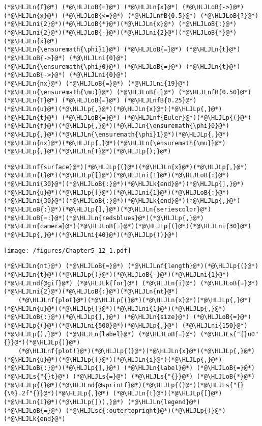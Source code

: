 \documentclass[12pt,a4paper]{article}
\newcommand{\HLJLk}[1]{\textcolor[RGB]{148,91,176}{\textbf{#1}}}
\newcommand{\HLJLn}[1]{#1}
\newcommand{\HLJLnd}[1]{\textcolor[RGB]{214,102,97}{#1}}
\newcommand{\HLJLnf}[1]{\textcolor[RGB]{66,102,213}{#1}}
\newcommand{\HLJLs}[1]{\textcolor[RGB]{201,61,57}{#1}}
\newcommand{\HLJLsc}[1]{\textcolor[RGB]{201,61,57}{#1}}
\newcommand{\HLJLnfB}[1]{\textcolor[RGB]{59,151,46}{#1}}
\newcommand{\HLJLni}[1]{\textcolor[RGB]{59,151,46}{#1}}
\newcommand{\HLJLoB}[1]{\textcolor[RGB]{102,102,102}{\textbf{#1}}}
\newcommand{\HLJLp}[1]{#1}
\begin{document}
\begin{lstlisting}
(*@\HLJLn{f}@*) (*@\HLJLoB{=}@*) (*@\HLJLn{x}@*) (*@\HLJLoB{->}@*) (*@\HLJLn{x}@*) (*@\HLJLoB{<=}@*) (*@\HLJLnfB{0.5}@*) (*@\HLJLoB{?}@*) (*@\HLJLni{2}@*)(*@\HLJLoB{*}@*)(*@\HLJLn{x}@*) (*@\HLJLoB{:}@*) (*@\HLJLni{2}@*)(*@\HLJLoB{-}@*)(*@\HLJLni{2}@*)(*@\HLJLoB{*}@*)(*@\HLJLn{x}@*)
(*@\HLJLn{\ensuremath{\phi}1}@*) (*@\HLJLoB{=}@*) (*@\HLJLn{t}@*) (*@\HLJLoB{->}@*) (*@\HLJLni{0}@*)
(*@\HLJLn{\ensuremath{\phi}0}@*) (*@\HLJLoB{=}@*) (*@\HLJLn{t}@*) (*@\HLJLoB{->}@*) (*@\HLJLni{0}@*)
(*@\HLJLn{nx}@*) (*@\HLJLoB{=}@*) (*@\HLJLni{19}@*)
(*@\HLJLn{\ensuremath{\mu}}@*) (*@\HLJLoB{=}@*) (*@\HLJLnfB{0.50}@*)
(*@\HLJLn{T}@*) (*@\HLJLoB{=}@*) (*@\HLJLnfB{0.25}@*)
(*@\HLJLn{u}@*)(*@\HLJLp{,}@*)(*@\HLJLn{x}@*)(*@\HLJLp{,}@*)(*@\HLJLn{t}@*) (*@\HLJLoB{=}@*) (*@\HLJLnf{Euler}@*)(*@\HLJLp{(}@*)(*@\HLJLn{f}@*)(*@\HLJLp{,}@*)(*@\HLJLn{\ensuremath{\phi}0}@*)(*@\HLJLp{,}@*)(*@\HLJLn{\ensuremath{\phi}1}@*)(*@\HLJLp{,}@*)(*@\HLJLn{nx}@*)(*@\HLJLp{,}@*)(*@\HLJLn{\ensuremath{\mu}}@*)(*@\HLJLp{,}@*)(*@\HLJLn{T}@*)(*@\HLJLp{);}@*)
\end{lstlisting}


\begin{lstlisting}
(*@\HLJLnf{surface}@*)(*@\HLJLp{(}@*)(*@\HLJLn{x}@*)(*@\HLJLp{,}@*)(*@\HLJLn{t}@*)(*@\HLJLp{[}@*)(*@\HLJLni{1}@*)(*@\HLJLoB{:}@*)(*@\HLJLni{30}@*)(*@\HLJLoB{:}@*)(*@\HLJLk{end}@*)(*@\HLJLp{],}@*)(*@\HLJLn{u}@*)(*@\HLJLp{[}@*)(*@\HLJLni{1}@*)(*@\HLJLoB{:}@*)(*@\HLJLni{30}@*)(*@\HLJLoB{:}@*)(*@\HLJLk{end}@*)(*@\HLJLp{,}@*)(*@\HLJLoB{:}@*)(*@\HLJLp{],}@*)(*@\HLJLn{seriescolor}@*)(*@\HLJLoB{=:}@*)(*@\HLJLn{redsblues}@*)(*@\HLJLp{,}@*) (*@\HLJLn{camera}@*)(*@\HLJLoB{=}@*)(*@\HLJLp{(}@*)(*@\HLJLni{30}@*)(*@\HLJLp{,}@*)(*@\HLJLni{40}@*)(*@\HLJLp{))}@*)
\end{lstlisting}

\texttt{[image: /figures/Chapter5\_12\_1.pdf]}

\begin{lstlisting}
(*@\HLJLn{nt}@*) (*@\HLJLoB{=}@*) (*@\HLJLnf{length}@*)(*@\HLJLp{(}@*)(*@\HLJLn{t}@*)(*@\HLJLp{)}@*)(*@\HLJLoB{-}@*)(*@\HLJLni{1}@*)
(*@\HLJLnd{@gif}@*) (*@\HLJLk{for}@*) (*@\HLJLn{i}@*) (*@\HLJLoB{=}@*) (*@\HLJLni{2}@*)(*@\HLJLoB{:}@*)(*@\HLJLn{nt}@*) 
    (*@\HLJLnf{plot}@*)(*@\HLJLp{(}@*)(*@\HLJLn{x}@*)(*@\HLJLp{,}@*) (*@\HLJLn{u}@*)(*@\HLJLp{[}@*)(*@\HLJLni{1}@*)(*@\HLJLp{,}@*)(*@\HLJLoB{:}@*)(*@\HLJLp{],}@*) (*@\HLJLn{size}@*) (*@\HLJLoB{=}@*) (*@\HLJLp{(}@*)(*@\HLJLni{500}@*)(*@\HLJLp{,}@*) (*@\HLJLni{150}@*)(*@\HLJLp{),}@*) (*@\HLJLn{label}@*) (*@\HLJLoB{=}@*) (*@\HLJLs{"{}u0"{}}@*)(*@\HLJLp{)}@*)
    (*@\HLJLnf{plot!}@*)(*@\HLJLp{(}@*)(*@\HLJLn{x}@*)(*@\HLJLp{,}@*) (*@\HLJLn{u}@*)(*@\HLJLp{[}@*)(*@\HLJLn{i}@*)(*@\HLJLp{,}@*)(*@\HLJLoB{:}@*)(*@\HLJLp{],}@*) (*@\HLJLn{label}@*) (*@\HLJLoB{=}@*) (*@\HLJLs{"{}t}@*) (*@\HLJLs{=}@*) (*@\HLJLs{"{}}@*) (*@\HLJLoB{*}@*) (*@\HLJLp{(}@*)(*@\HLJLnd{@sprintf}@*)(*@\HLJLp{(}@*)(*@\HLJLs{"{}{\%}.2f"{}}@*)(*@\HLJLp{,}@*) (*@\HLJLn{t}@*)(*@\HLJLp{[}@*)(*@\HLJLn{i}@*)(*@\HLJLp{])),}@*) (*@\HLJLn{legend}@*) (*@\HLJLoB{=}@*) (*@\HLJLsc{:outertopright}@*)(*@\HLJLp{)}@*)
(*@\HLJLk{end}@*)
\end{lstlisting}
\end{document}
